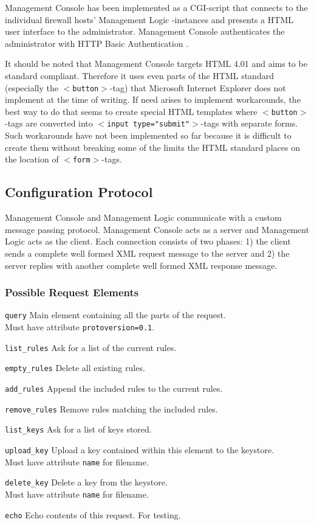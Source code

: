 \documentclass[a4paper,titlepage]{article}
\begin{document}
Management Console has been implemented as a CGI-script that connects
to the individual firewall hosts' Management Logic -instances and
presents a HTML user interface to the administrator. Management
Console authenticates the administrator with HTTP Basic Authentication
\cite{rfc2617}.

It should be noted that Management Console targets HTML
4.01\cite{html401} and aims to be standard compliant. Therefore it
uses even parts of the HTML standard (especially the
$<$\texttt{button}$>$-tag) that Microsoft Internet Explorer does not
implement at the time of writing. If need arises to implement
workarounds, the best way to do that seems to create special HTML
templates where $<$\texttt{button}$>$-tags are converted into
$<$\texttt{input type="submit"}$>$-tags with separate forms. Such
workarounds have not been implemented so far because it is difficult
to create them without breaking some of the limits the HTML standard
places on the location of $<$\texttt{form}$>$-tags.

\subsection{Configuration Protocol}

Management Console and Management Logic communicate with a custom
message passing protocol. Management Console acts as a server and
Management Logic acts as the client. Each connection consists of two
phases: 1) the client sends a complete well formed XML request message
to the server and 2) the server replies with another complete well
formed XML response message.

\subsubsection*{Possible Request Elements}

\begin{description}
\item \texttt{query} Main element containing all the parts of the request. \\
        Must have attribute \texttt{protoversion=0.1}.
\item \texttt{list\_rules} Ask for a list of the current rules.
\item \texttt{empty\_rules} Delete all existing rules.
\item \texttt{add\_rules} Append the included rules to the current rules.
\item \texttt{remove\_rules} Remove rules matching the included rules.
\item \texttt{list\_keys} Ask for a list of keys stored.
\item \texttt{upload\_key} Upload a key contained within this element to the keystore. \\
        Must have attribute \texttt{name} for filename.
\item \texttt{delete\_key} Delete a key from the keystore. \\
        Must have attribute \texttt{name} for filename.
\item \texttt{echo} Echo contents of this request. For testing.
\end{description}
\end{document}
